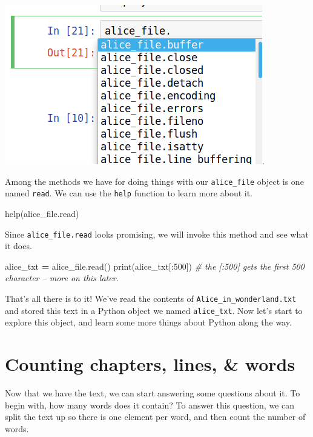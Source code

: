 \documentclass[]{book}
\newenvironment{Shaded}{\begin{snugshade}}{\end{snugshade}}
\newcommand{\BuiltInTok}[1]{#1}
\newcommand{\CommentTok}[1]{\textcolor[rgb]{0.56,0.35,0.01}{\textit{#1}}}
\newcommand{\DecValTok}[1]{\textcolor[rgb]{0.00,0.00,0.81}{#1}}
\newcommand{\NormalTok}[1]{#1}
\newcommand{\OperatorTok}[1]{\textcolor[rgb]{0.81,0.36,0.00}{\textbf{#1}}}
\begin{document}
\includegraphics{Python/PythonIntro/images/notebook_file_completion.png}.

Among the methods we have for doing things with our \texttt{alice\_file} object is one named \texttt{read}. We can use the \texttt{help} function to learn more about it.

\begin{Shaded}
\begin{Highlighting}[]
\BuiltInTok{help}\NormalTok{(alice_file.read)}
\end{Highlighting}
\end{Shaded}

Since \texttt{alice\_file.read} looks promising, we will invoke this method and see what it does.

\begin{Shaded}
\begin{Highlighting}[]
\NormalTok{alice_txt }\OperatorTok{=}\NormalTok{ alice_file.read()}
\BuiltInTok{print}\NormalTok{(alice_txt[:}\DecValTok{500}\NormalTok{]) }\CommentTok{# the [:500] gets the first 500 character -- more on this later.}
\end{Highlighting}
\end{Shaded}

That's all there is to it! We've read the contents of \texttt{Alice\_in\_wonderland.txt} and stored this text in a Python object we named \texttt{alice\_txt}. Now let's start to explore this object, and learn some more things about Python along the way.

\hypertarget{counting-chapters-lines-words}{%
\section{Counting chapters, lines, \& words}\label{counting-chapters-lines-words}}

Now that we have the text, we can start answering some questions about it. To begin with, how many words does it contain? To answer this question, we can split the text up so there is one element per word, and then count the number of words.
\end{document}
